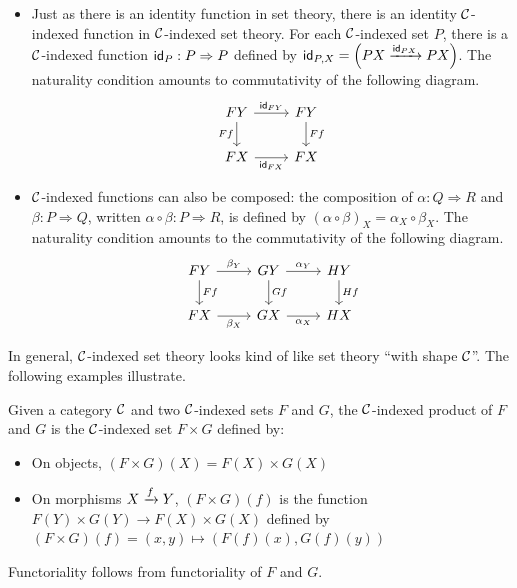 \begin{itemize}
\item Just as there is an identity function in set theory,
  there is an identity \(\mathcal C\)-indexed function in \(\mathcal C\)-indexed set theory.
  For each \(\mathcal C\)-indexed set \(P\),
  there is a \(\mathcal C\)-indexed function \(\mathsf{id}_P : P \Rightarrow P\)
  defined by \(\mathsf{id}_{P,X} = \left(PX \xrightarrow{\mathsf{id}_{PX}} PX\right)\).
  The naturality condition amounts to commutativity of the following diagram.
  \[%
\begin{tikzcd}
FY \arrow[r, "\idt_{FY}"] \arrow[d, "Ff"'] & FY \arrow[d, "Ff"] \\
FX \arrow[r, "\idt_{FX}"']                 & FX
\end{tikzcd}\]
\item \(\mathcal C\)-indexed functions can also be composed:
  the composition of \(\alpha : Q \Rightarrow R\)
  and \(\beta: P \Rightarrow Q\),
  written \(\alpha\circ\beta : P \Rightarrow R\),
  is defined by \((\alpha\circ\beta)_X = \alpha_X \circ \beta_X\).
  The naturality condition amounts to the commutativity of the following diagram.
  \[
\begin{tikzcd}
FY \arrow[d, "Ff"] \arrow[r, "\beta_Y"] & GY \arrow[d, "Gf"] \arrow[r, "\alpha_Y"] & HY \arrow[d, "Hf"] \\
FX \arrow[r, "\beta_X"']                & GX \arrow[r, "\alpha_X"']                & HX
\end{tikzcd}
\]
\end{itemize}

In general, \(\mathcal C\)-indexed set theory looks
kind of like set theory ``with shape \(\mathcal C\)''.
The following examples illustrate.


\begin{definition}
  \sloppy
  Given a category $\mathcal C$ and two \(\mathcal C\)-indexed sets $F$ and $G$,
  the $\mathcal C$-indexed product of $F$ and $G$
  is the \(\mathcal C\)-indexed set
  $F \times G$
  defined by:
  \begin{itemize}
    \item On objects, $(F \times G)(X) = F(X) \times G(X)$
    \item On morphisms $X \xrightarrow{f} Y$,
    $(F \times G)(f)$ is the function $F(Y) \times G(Y) \to F(X) \times G(X)$
      defined by $(F \times G)(f) = (x,y) \mapsto (F(f)(x), G(f)(y))$
  \end{itemize}
  Functoriality follows from functoriality of \(F\) and \(G\).
\end{definition} 

